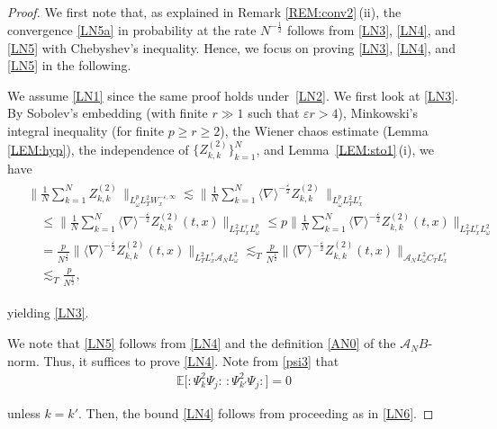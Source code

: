\documentclass[letterpaper, 11pt,  reqno]{amsart}
\newcommand{\1}{\hspace{0.5mm}\text{I}\hspace{0.2mm}}
\newcommand{\noi}{\noindent}
\newcommand{\E}{\mathbb{E}}
\newcommand{\eps}{\varepsilon}
\newcommand{\nb}{\nabla}
\newcommand{\les}{\lesssim}
\newcommand{\A}{\mathcal{A}}
\newcommand{\jb}[1]{\langle #1 \rangle}
\newcommand{\wick}[1]{:\!{#1}\!:}
\renewcommand{\o}{\omega}
\numberwithin{equation}{section}
\numberwithin{theorem}{section}
\begin{document}
\begin{proof}
We first note that, 
as explained in  Remark \ref{REM:conv2}\,(ii), 
 the convergence \eqref{LN5a} in probability
at the rate $N^{-\frac 12}$
follows from \eqref{LN3}, \eqref{LN4}, and \eqref{LN5}
with  Chebyshev's inequality.
Hence, 
 we focus on proving \eqref{LN3}, \eqref{LN4}, and \eqref{LN5}
 in the following.

We assume 
\eqref{LN1} since the same proof holds under~\eqref{LN2}.
We first look at \eqref{LN3}. 
By Sobolev's embedding (with finite $r \gg1$ such that $\eps r > 4$),
 Minkowski's integral inequality
 (for finite $p \ge r \ge 2$),  the Wiener chaos estimate (Lemma \ref{LEM:hyp}), 
the independence
of $\{Z_{k, k}^{(2)}\}_{k = 1}^N$, 
and  Lemma~\ref{LEM:sto1}\,(i), we have
\begin{align}
\begin{split}
& \bigg\| \frac{1}{N} \sum_{k = 1}^N 
 Z_{k, k}^{(2)}\, \bigg\|_{L^p_\o L_T^2 W_x^{- \eps, \infty}} 
\les  \bigg\| \frac{1}{N} \sum_{k = 1}^N \jb{\nb}^{- \frac{\eps}{2}} 
Z_{k, k}^{(2)}\, 
\bigg\|_{L^p_\o L_T^2 L_x^r}\\
&\quad \leq  \bigg\| \frac{1}{N} \sum_{k = 1}^N \jb{\nb}^{- \frac{\eps}{2}} 
Z_{k, k}^{(2)}(t, x) \bigg\|_{L_T^2 L_x^r L^p_\o} 
\le p
 \bigg\| \frac{1}{N} \sum_{k = 1}^N \jb{\nb}^{- \frac{\eps}{2}} 
Z_{k, k}^{(2)}(t, x) \bigg\|_{L_T^2 L_x^r L^2_\o} \\
& \quad =  
\frac{p}{N^\frac 12 } 
\|  \jb{\nb}^{- \frac{\eps}{2}} 
Z_{k, k}^{(2)}(t, x) \|_{L_T^2 L_x^r \A_N L^2_\o} 
\les_T   
\frac{p }{N^\frac 12 } 
\|  \jb{\nb}^{- \frac{\eps}{2}} 
Z_{k, k}^{(2)}(t, x) \|_{\A_N L^2_\o C_T L_x^r } \\
&\quad \les_T \frac{p}{N^{\frac 12}},
\end{split}
\label{LN6}
\end{align}

\noi
yielding \eqref{LN3}.






We note that \eqref{LN5} follows from \eqref{LN4}
and the definition \eqref{AN0} of the $\A_NB$-norm.
Thus, it suffices  to prove \eqref{LN4}.
Note from 
\eqref{psi3} that 
\begin{align*}
\E\big[ 
\wick{\Psi_k^2 \Psi_j} \, \wick{\Psi_{k'}^2 \Psi_{j}}
\big] = 0
\end{align*}


\noi
unless $k = k'$.
Then, the bound \eqref{LN4} follows
from proceeding 
 as in \eqref{LN6}.
\end{proof}
\end{document}
